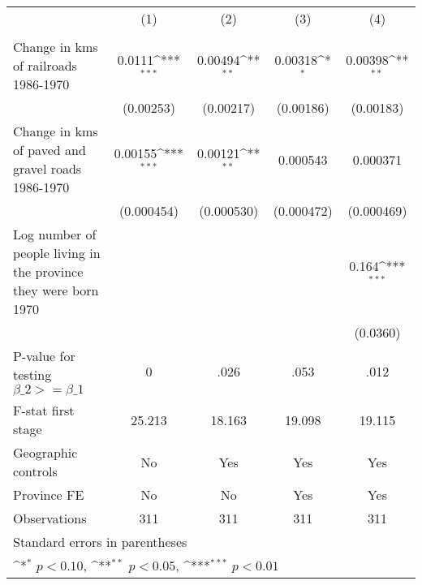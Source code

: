 {
\def\sym#1{\ifmmode^{#1}\else\(^{#1}\)\fi}
\begin{tabular}{l*{4}{c}}
\hline\hline
                &\multicolumn{1}{c}{(1)}&\multicolumn{1}{c}{(2)}&\multicolumn{1}{c}{(3)}&\multicolumn{1}{c}{(4)}\\
                &\multicolumn{1}{c}{}&\multicolumn{1}{c}{}&\multicolumn{1}{c}{}&\multicolumn{1}{c}{}\\
\hline
Change in kms of railroads 1986-1970&   0.0111\sym{***}&  0.00494\sym{**} &  0.00318\sym{*}  &  0.00398\sym{**} \\
                &(0.00253)         &(0.00217)         &(0.00186)         &(0.00183)         \\
[1em]
Change in kms of paved and gravel roads 1986-1970&  0.00155\sym{***}&  0.00121\sym{**} & 0.000543         & 0.000371         \\
                &(0.000454)         &(0.000530)         &(0.000472)         &(0.000469)         \\
[1em]
Log number of people living in the province they were born 1970&                  &                  &                  &    0.164\sym{***}\\
                &                  &                  &                  & (0.0360)         \\
\hline
P-value for testing $\beta\_{2} >= \beta\_{1}$&        0         &     .026         &     .053         &     .012         \\
F-stat first stage&   25.213         &   18.163         &   19.098         &   19.115         \\
Geographic controls&       No         &      Yes         &      Yes         &      Yes         \\
Province FE     &       No         &       No         &      Yes         &      Yes         \\
Observations    &      311         &      311         &      311         &      311         \\
\hline\hline
\multicolumn{5}{l}{\footnotesize Standard errors in parentheses}\\
\multicolumn{5}{l}{\footnotesize \sym{*} \(p<0.10\), \sym{**} \(p<0.05\), \sym{***} \(p<0.01\)}\\
\end{tabular}
}
